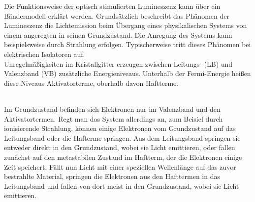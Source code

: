 Die Funktionsweise der optisch stimulierten Lumineszenz kann über ein Bändermodell erklärt werden. Grundsätzlich beschreibt das Phänomen der Lumineszenz die Lichtemission beim Übergang eines physikalischen Systems von einem angeregten in seinen Grundzustand.
Die Anregung des Systems kann beispielsweise durch Strahlung erfolgen. Typischerweise tritt dieses Phänomen bei elektrischen Isolatoren auf.\\
Unregelmäßigkeiten im Kristallgitter erzeugen zwischen Leitungs- (LB) und Valenzband (VB) zusätzliche Energieniveaus. Unterhalb der Fermi-Energie heißen diese Niveaus Aktivatorterme, oberhalb davon Haftterme. 

\begin{center}
    \minipanf    
    \label{fig:band}
    \minipend
\end{center} 
\ \\
Im Grundzustand befinden sich Elektronen nur im Valenzband und den Aktivatortermen.
Regt man das System allerdings an, zum Beisiel durch ionisierende Strahlung, können einige Elektronen vom Grundzustand auf das Leitungsband oder die Hafterme springen. Aus dem Leitungsband springen sie entweder direkt in den Grundzustand, wobei sie Licht emittieren, oder fallen zunächst auf den metastabilen Zustand im Haftterm, der die Elektronen einige Zeit speichert.
Fällt nun Licht mit einer speziellen Wellenlänge auf das zuvor bestrahlte Material, springen die Elektronen aus den Hafttermen in das Leitungsband und fallen von dort meist in den Grundzustand, wobei sie Licht emittieren. \cite{PA_alt}

